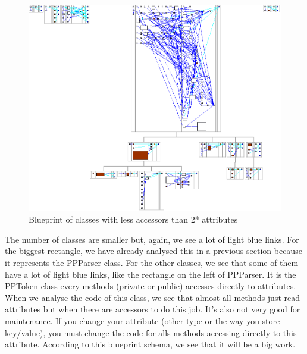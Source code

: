 \begin{figure}[ht]
\centering
\label{less_access_blueprint}
\includegraphics[scale=0.35]{less_access_blueprint.png}
\caption{Blueprint of classes with less accessors than 2* attributes}
\end{figure}
The number of classes are smaller but, again, we see a lot of light blue links.  For the biggest rectangle, we have already analysed this in a previous section because it represents the PPParser class.  For the other classes, we see that some of them have a lot of light blue links, like the rectangle on the left of PPParser.  It is the PPToken class every methods (private or public) accesses directly to attributes.  When we analyse the code of this class, we see that almost all methods just read attributes but when there are accessors to do this job.  It's also not very good for maintenance.  If you change your attribute (other type or the way you store key/value), you must change the code for alls methods accessing directly to this attribute. According to this blueprint schema, we  see that it will be a big work.
